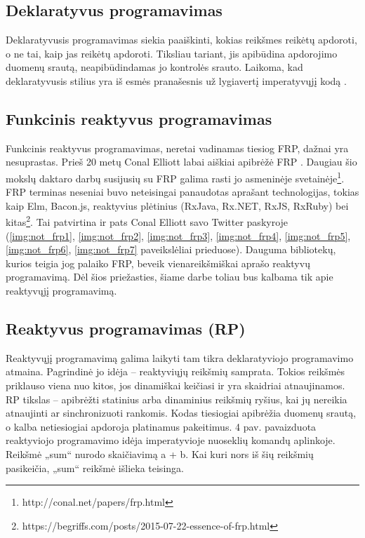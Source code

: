 \subsection{Deklaratyvus programavimas}

Deklaratyvusis programavimas siekia paaiškinti, kokias reikšmes reikėtų apdoroti, o ne tai, kaip jas reikėtų apdoroti. Tiksliau tariant, jis apibūdina apdorojimo duomenų srautą, neapibūdindamas jo kontrolės srauto. Laikoma, kad deklaratyvusis stilius yra iš esmės pranašesnis už lygiavertį imperatyvųjį kodą \cite{DeclarativeProgramming}.

\subsection{Funkcinis reaktyvus programavimas}

Funkcinis reaktyvus programavimas, neretai vadinamas tiesiog FRP, dažnai yra nesuprastas. Prieš 20 metų Conal Elliott labai aiškiai apibrėžė FRP \cite{ElliottHudak97:Fran}. Daugiau šio mokslų daktaro darbų susijusių su FRP galima rasti jo asmeninėje svetainėje\footnote{http://conal.net/papers/frp.html}. FRP terminas neseniai buvo neteisingai panaudotas aprašant technologijas, tokias kaip Elm, Bacon.js, reaktyvius plėtinius (RxJava, Rx.NET, RxJS, RxRuby) bei kitas\footnote{https://begriffs.com/posts/2015-07-22-essence-of-frp.html}. Tai patvirtina ir pats Conal Elliott savo Twitter paskyroje (\ref{img:not_frp1}, \ref{img:not_frp2}, \ref{img:not_frp3}, \ref{img:not_frp4}, \ref{img:not_frp5}, \ref{img:not_frp6}, \ref{img:not_frp7} paveikslėliai prieduose). Dauguma bibliotekų, kurios teigia jog palaiko FRP, beveik vienareikšmiškai aprašo reaktyvų programavimą. Dėl šios priežasties, šiame darbe toliau bus kalbama tik apie reaktyvųjį programavimą.

\subsection{Reaktyvus programavimas (RP)}

Reaktyvųjį programavimą galima laikyti tam tikra deklaratyviojo programavimo atmaina. Pagrindinė jo idėja – reaktyviųjų reikšmių samprata. Tokios reikšmės priklauso viena nuo kitos, jos dinamiškai keičiasi ir yra skaidriai atnaujinamos. RP tikslas – apibrėžti statinius arba dinaminius reikšmių ryšius, kai jų nereikia atnaujinti ar sinchronizuoti rankomis. Kodas tiesiogiai apibrėžia duomenų srautą, o kalba netiesiogiai apdoroja platinamus pakeitimus. 4 pav. pavaizduota reaktyviojo programavimo idėja imperatyvioje nuoseklių komandų aplinkoje. Reikšmė „sum“ nurodo skaičiavimą a + b. Kai kuri nors iš šių reikšmių pasikeičia, „sum“ reikšmė išlieka teisinga.

